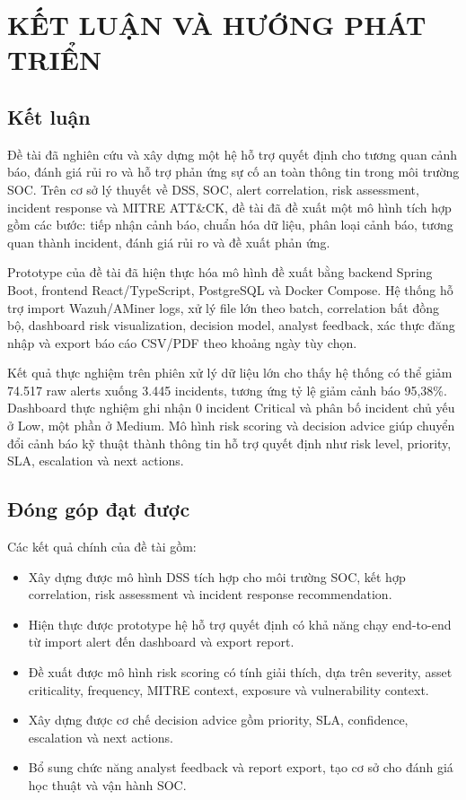 \documentclass[a4paper,12pt,oneside]{book}
\begin{document}
\chapter{\MakeTextUppercase{Kết luận và hướng phát triển}}

\section{Kết luận}
{\fontsize{13pt}{15.6pt}\selectfont

Đề tài đã nghiên cứu và xây dựng một hệ hỗ trợ quyết định cho tương quan cảnh báo, đánh giá rủi ro và hỗ trợ phản ứng sự cố an toàn thông tin trong môi trường SOC. Trên cơ sở lý thuyết về DSS, SOC, alert correlation, risk assessment, incident response và MITRE ATT\&CK, đề tài đã đề xuất một mô hình tích hợp gồm các bước: tiếp nhận cảnh báo, chuẩn hóa dữ liệu, phân loại cảnh báo, tương quan thành incident, đánh giá rủi ro và đề xuất phản ứng.

\noindent Prototype của đề tài đã hiện thực hóa mô hình đề xuất bằng backend Spring Boot, frontend React/TypeScript, PostgreSQL và Docker Compose. Hệ thống hỗ trợ import Wazuh/AMiner logs, xử lý file lớn theo batch, correlation bất đồng bộ, dashboard risk visualization, decision model, analyst feedback, xác thực đăng nhập và export báo cáo CSV/PDF theo khoảng ngày tùy chọn.

\noindent Kết quả thực nghiệm trên phiên xử lý dữ liệu lớn cho thấy hệ thống có thể giảm 74.517 raw alerts xuống 3.445 incidents, tương ứng tỷ lệ giảm cảnh báo 95,38\%. Dashboard thực nghiệm ghi nhận 0 incident Critical và phân bố incident chủ yếu ở Low, một phần ở Medium. Mô hình risk scoring và decision advice giúp chuyển đổi cảnh báo kỹ thuật thành thông tin hỗ trợ quyết định như risk level, priority, SLA, escalation và next actions.

}

\section{Đóng góp đạt được}
{\fontsize{13pt}{15.6pt}\selectfont

Các kết quả chính của đề tài gồm:

\begin{itemize}
    \item Xây dựng được mô hình DSS tích hợp cho môi trường SOC, kết hợp correlation, risk assessment và incident response recommendation.
    \item Hiện thực được prototype hệ hỗ trợ quyết định có khả năng chạy end-to-end từ import alert đến dashboard và export report.
    \item Đề xuất được mô hình risk scoring có tính giải thích, dựa trên severity, asset criticality, frequency, MITRE context, exposure và vulnerability context.
    \item Xây dựng được cơ chế decision advice gồm priority, SLA, confidence, escalation và next actions.
    \item Bổ sung chức năng analyst feedback và report export, tạo cơ sở cho đánh giá học thuật và vận hành SOC.
\end{itemize}

}
\end{document}
